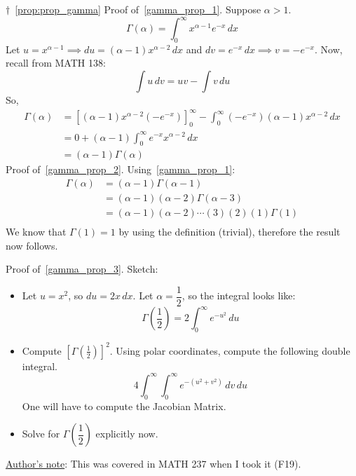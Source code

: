 \begin{Proof}{$ \dagger $~\ref{prop:prop_gamma}}{}
    Proof of~\ref{gamma_prop_1}. Suppose $ \alpha>1 $.
    \[ \Gamma(\alpha)=\int_{0}^{\infty} x^{\alpha-1}e^{-x}\, d{x}  \]
    Let $ u=x^{\alpha-1} \implies du=(\alpha-1)x^{\alpha-2}\,dx $ and $ dv=e^{-x}\,dx\implies v=-e^{-x} $. Now,
    recall from MATH 138:
    \[ \int u\, d{v} =uv-\int v\, d{u} \]
    So,
    \begin{align*}
        \Gamma(\alpha)
         & = \left[ (\alpha-1)x^{\alpha-2}\left( -e^{-x} \right) \right]_0^\infty-\int_{0}^{\infty}\left(-e^{-x}\right)
        (\alpha-1)x^{\alpha-2}\, d{x}                                                                                   \\
         & =0+(\alpha-1)\int_{0}^{\infty}e^{-x} x^{\alpha-2}\, d{x}                                                     \\
         & =(\alpha-1)\Gamma(\alpha)
    \end{align*}
    Proof of~\ref{gamma_prop_2}. Using~\ref{gamma_prop_1}:
    \begin{align*}
        \Gamma(\alpha)
         & =(\alpha-1)\Gamma(\alpha-1)                    \\
         & =(\alpha-1)(\alpha-2)\Gamma(\alpha-3)          \\
         & =(\alpha-1)(\alpha-2)\cdots (3)(2)(1)\Gamma(1) \\
    \end{align*}
    We know that $ \Gamma(1)=1 $ by using the definition (trivial), therefore the result now follows.

    Proof of~\ref{gamma_prop_3}. Sketch:
    \begin{itemize}
        \item Let $ u=x^2 $, so $ du=2x\,dx $. Let $ \alpha=\dfrac{1}{2} $, so the integral looks like:
              \[ \Gamma\left( \frac{1}{2}  \right)=2\int_{0}^{\infty} e^{-u^2}\, d{u}  \]
        \item Compute $ \left[ \Gamma \left( \frac{1}{2}  \right) \right]^2 $. Using polar coordinates,
              compute the following double integral.
              \[ 4 \int_{0}^{\infty} \int_{0}^{\infty} e^{-(u^2+v^2)}\, d{v} \, d{u}  \]
              One will have to compute the Jacobian Matrix.
        \item Solve for $ \Gamma\left( \dfrac{1}{2} \right) $ explicitly now.
    \end{itemize}
    \underline{Author's note}: This was covered in MATH 237 when I took it (F19).
\end{Proof}


